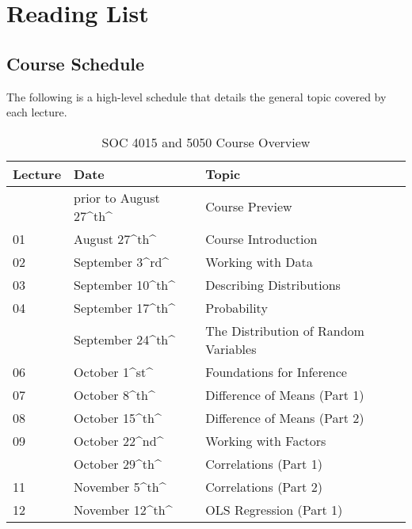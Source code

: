 \documentclass[]{book}
\theoremstyle{definition}
\theoremstyle{definition}
\theoremstyle{definition}
\theoremstyle{remark}
\begin{document}
\hypertarget{part-reading-list}{%
\part{Reading List}\label{part-reading-list}}

\hypertarget{course-schedule}{%
\chapter{Course Schedule}\label{course-schedule}}

The following is a high-level schedule that details the general topic
covered by each lecture.

\begin{table}

\caption{\label{tab:unnamed-chunk-1}SOC 4015 and 5050 Course Overview}
\centering
\begin{tabular}[t]{lll}
\toprule
Lecture & Date & Topic\\
\midrule
 & prior to August 27\textasciicircum{}th\textasciicircum{} & Course Preview\\
01 & August 27\textasciicircum{}th\textasciicircum{} & Course Introduction\\
02 & September 3\textasciicircum{}rd\textasciicircum{} & Working with Data\\
03 & September 10\textasciicircum{}th\textasciicircum{} & Describing Distributions\\
04 & September 17\textasciicircum{}th\textasciicircum{} & Probability\\
\addlinespace
05 & September 24\textasciicircum{}th\textasciicircum{} & The Distribution of Random Variables\\
06 & October 1\textasciicircum{}st\textasciicircum{} & Foundations for Inference\\
07 & October 8\textasciicircum{}th\textasciicircum{} & Difference of Means (Part 1)\\
08 & October 15\textasciicircum{}th\textasciicircum{} & Difference of Means (Part 2)\\
09 & October 22\textasciicircum{}nd\textasciicircum{} & Working with Factors\\
\addlinespace
10 & October 29\textasciicircum{}th\textasciicircum{} & Correlations (Part 1)\\
11 & November 5\textasciicircum{}th\textasciicircum{} & Correlations (Part 2)\\
12 & November 12\textasciicircum{}th\textasciicircum{} & OLS Regression (Part 1)\\

\end{tabular}
\end{table}
\end{document}
